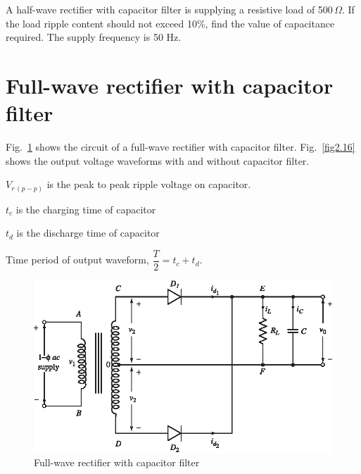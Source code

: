 \begin{example}\label{exam2.15}
A half-wave rectifier with capacitor  filter is supplying a resistive
load of \hbox{500\,$\Omega$.} If the load ripple content should not exceed
10\%, find the value of capacitance required. The supply frequency is
50 Hz.
\end{example}


\section{Full-wave rectifier with capacitor filter}\label{sec2.21}

Fig.~\ref{fig2.15} shows the circuit of a full-wave rectifier with capacitor
filter. Fig.~\ref{fig2.16} shows the output voltage waveforms with and without
capacitor filter.

$V_{r\,(p-p)}$ is the peak to peak ripple voltage on capacitor.

$t_c$ is the charging time of capacitor

$t_d$ is the discharge time of capacitor

Time period of output waveform, $\dfrac{T}{2} = t_c + t_d$.
\begin{figure}[H]
\centering
\includegraphics{chap2/add-fig/S3-EE-02-015.eps}
\caption{Full-wave rectifier with capacitor filter}\label{fig2.15}
\end{figure}

